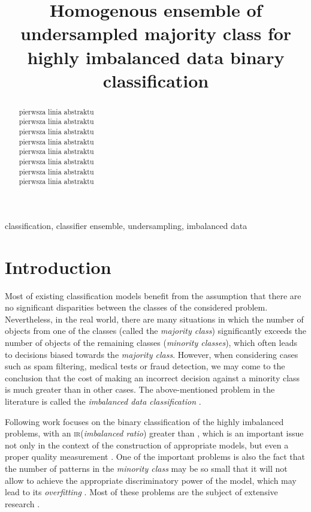 \documentclass[pmlr]{jmlr}
\title
[Homogenous ensemble of undersampled majority class]
{
	Homogenous ensemble of undersampled majority class for highly imbalanced data binary classification%
}
\begin{document}
\maketitle

\begin{abstract}
pierwsza linia abstraktu\\
pierwsza linia abstraktu\\
pierwsza linia abstraktu\\
pierwsza linia abstraktu\\
pierwsza linia abstraktu\\
pierwsza linia abstraktu\\
pierwsza linia abstraktu\\
pierwsza linia abstraktu
\end{abstract}
\begin{keywords}
classification, classifier ensemble, undersampling, imbalanced data
\end{keywords}

\section{Introduction}
\label{sec:intro}

Most of existing classification models benefit from the assumption that there are no significant disparities between the classes of the considered problem. Nevertheless, in the real world, there are many situations in which the number of objects from one of the classes (called the \emph{majority class}) significantly exceeds the number of objects of the remaining classes (\emph{minority classes}), which often leads to decisions biased towards the \emph{majority class}. However, when considering cases such as spam filtering, medical tests or fraud detection, we may come to the conclusion that the cost of making an incorrect decision against a minority class is much greater than in other cases. The above-mentioned problem in the literature is called the \emph{imbalanced data classification} \citep{Wang:2017,Sun:2009}.

Following work focuses on the binary classification of the highly imbalanced problems, with an \textsc{ir}(\emph{imbalanced ratio}) greater than , which is an important issue not only in the context of the construction of appropriate models, but even a proper quality measurement \citep{Elazmeh:2006}. One of the important problems is also the fact that the number of patterns in the \emph{minority class} may be so small that it will not allow to achieve the appropriate discriminatory power of the model, which may lead to its \emph{overfitting} \citep{Chen:2008}. Most of these problems are the subject of extensive research \citep{Bunkhumpornpat:2009,Chawla:2002}.
\end{document}

